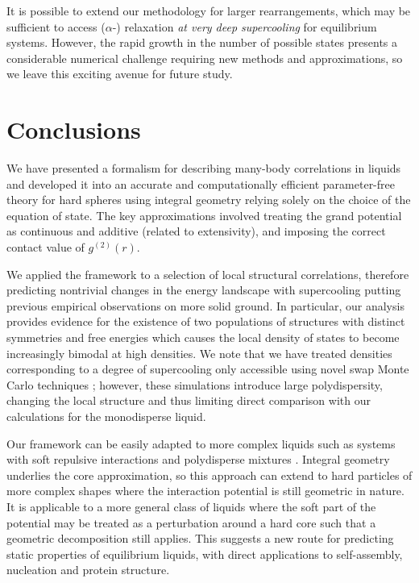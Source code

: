 \documentclass[11pt,twoside]{report}
\begin{document}
It is possible to extend our methodology for larger rearrangements, which may be sufficient to access ($\alpha$-) relaxation \emph{at very deep supercooling} for equilibrium systems.
However, the rapid growth in the number of possible states presents a considerable numerical challenge requiring new methods and approximations, so we leave this exciting avenue for future study.

\section{Conclusions}

We have presented a formalism for describing many-body correlations in liquids and developed it into an accurate and computationally efficient parameter-free theory for hard spheres using integral geometry relying solely on the choice of the equation of state.
The key approximations involved treating the grand potential as continuous and additive (related to extensivity), and imposing the correct contact value of $g^{(2)}(r)$.

We applied the framework to a selection of local structural correlations, therefore predicting nontrivial changes in the energy landscape with supercooling putting previous empirical observations on more solid ground.
In particular, our analysis provides evidence for the existence of two populations of structures with distinct symmetries and free energies which causes the local density of states to become increasingly bimodal at high densities.
We note that we have treated densities corresponding to a degree of supercooling only accessible using novel swap Monte Carlo techniques \cite{BerthierPRL2016}; however, these simulations introduce large polydispersity, changing the local structure \cite{CoslovichJPCM2018} and thus limiting direct comparison with our calculations for the monodisperse liquid.

Our framework can be easily adapted to more complex liquids such as systems with soft repulsive interactions and polydisperse mixtures \cite{KodamaJCP2011}.
Integral geometry underlies the core approximation, so this approach can extend to hard particles of more complex shapes where the interaction potential is still geometric in nature.
It is applicable to a more general class of liquids where the soft part of the potential may be treated as a perturbation around a hard core \cite{Hansen2013} such that a geometric decomposition still applies.
This suggests a new route for predicting static properties of equilibrium liquids, with direct applications to self-assembly, nucleation and protein structure.
\end{document}

